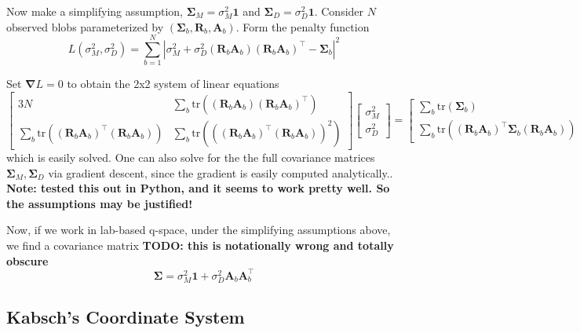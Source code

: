 \documentclass[11pt,a4paper]{article}
\def\v#1{\bm{{#1}}}
\def\tr{^\intercal}
\def\trace{\mathrm{tr}}
\begin{document}
Now make a simplifying assumption,
$\v\Sigma_M = \sigma_M^2 \v1$ and $\v\Sigma_D = \sigma_D^2 \v1$.
Consider $N$ observed blobs parameterized by $(\v\Sigma_b, \v{R}_b, \v{A}_b)$.
Form the penalty function
\begin{equation}
  L(\sigma_M^2, \sigma_D^2)
  = \sum_{b=1}^N
    \left|\sigma_M^2 + \sigma_D^2 (\v{R}_b \v{A}_b)(\v{R}_b\v{A}_b)\tr - \v\Sigma_b\right|^2
\end{equation}

Set $\v\nabla L = 0$ to obtain the 2x2 system of linear equations
\begin{equation}
  \begin{bmatrix}
    3N & \sum_b \trace( (\v{R}_b\v{A}_b)(\v{R}_b \v{A}_b)\tr) \\
    \sum_b \trace((\v{R}_b\v{A}_b)\tr(\v{R}_b \v{A}_b)) & \sum_b \trace(((\v{R}_b \v{A}_b)\tr(\v{R}_b\v{A}_b))^2)
  \end{bmatrix}
  \begin{bmatrix}
    \sigma_M^2 \\
    \sigma_D^2
  \end{bmatrix}
  =
  \begin{bmatrix}
    \sum_b \trace(\v\Sigma_b) \\
    \sum_b \trace((\v{R}_b \v{A}_b)\tr \v\Sigma_b (\v{R}_b \v{A}_b))
  \end{bmatrix},
\end{equation}
which is easily solved.
One can also solve for the the full covariance matrices $\v\Sigma_M, \v\Sigma_D$
via gradient descent, since the gradient is easily computed analytically..
\textbf{Note: tested this out in Python, and it seems to work pretty well.
So the assumptions may be justified!}

Now, if we work in lab-based q-space, under the simplifying assumptions above,
we find a covariance matrix
\textbf{TODO: this is notationally wrong and totally obscure}
\begin{equation} \v\Sigma = \sigma_M^2 \v1 + \sigma_D^2 \v{A}_b \v{A}_b\tr \end{equation}


\subsection{Kabsch's Coordinate System}
\end{document}
